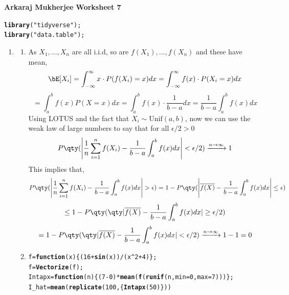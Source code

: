 \documentclass[12pt,english]{article}\usepackage[]{graphicx}\usepackage[]{xcolor}
\makeatletter
\newcommand{\hlnum}[1]{\textcolor[rgb]{0.686,0.059,0.569}{#1}}%
\newcommand{\hlsng}[1]{\textcolor[rgb]{0.192,0.494,0.8}{#1}}%
\newcommand{\hlopt}[1]{\textcolor[rgb]{0,0,0}{#1}}%
\newcommand{\hldef}[1]{\textcolor[rgb]{0.345,0.345,0.345}{#1}}%
\newcommand{\hlkwa}[1]{\textcolor[rgb]{0.161,0.373,0.58}{\textbf{#1}}}%
\newcommand{\hlkwb}[1]{\textcolor[rgb]{0.69,0.353,0.396}{#1}}%
\newcommand{\hlkwc}[1]{\textcolor[rgb]{0.333,0.667,0.333}{#1}}%
\newcommand{\hlkwd}[1]{\textcolor[rgb]{0.737,0.353,0.396}{\textbf{#1}}}%
\newenvironment{kframe}{%
 \def\at@end@of@kframe{}%
 \ifinner\ifhmode%
  \def\at@end@of@kframe{\end{minipage}}%
  \begin{minipage}{\columnwidth}%
 \fi\fi%
 \def\FrameCommand##1{\hskip\@totalleftmargin \hskip-\fboxsep
 \colorbox{shadecolor}{##1}\hskip-\fboxsep
     \hskip-\linewidth \hskip-\@totalleftmargin \hskip\columnwidth}%
 \MakeFramed {\advance\hsize-\width
   \@totalleftmargin\z@ \linewidth\hsize
   \@setminipage}}%
 {\par\unskip\endMakeFramed%
 \at@end@of@kframe}
\newenvironment{knitrout}{}{} %
\makeatother
\begin{document}
{\bf Arkaraj Mukherjee}
{\bf Worksheet 7}
\\
\begin{knitrout}
\color{fgcolor}\begin{kframe}
\begin{alltt}
\hlkwd{library}\hldef{(}\hlsng{"tidyverse"}\hldef{);}
\hlkwd{library}\hldef{(}\hlsng{"data.table"}\hldef{);}
\end{alltt}
\end{kframe}
\end{knitrout}
\begin{enumerate}[label=\arabic*.]
\item
\begin{enumerate}[label=(\alph*)]
\item As $X_1,\ldots,X_n$ are all i.i.d, so are $f(X_1),\ldots,f(X_n)$ and these have mean,
$$\bE[X_i]=\int_{-\infty}^{\infty}x\cdot
P(f(X_i)=x)dx=\int_{-\infty}^{\infty}f(x)\cdot
P(X_i=x)dx$$
$$=\int_a^bf(x)P(X=x)dx=\int_a^bf(x)\cdot\frac{1}{b-a}dx=\frac{1}{b-a}\int_a^bf(x)dx$$
Using LOTUS and the fact that $X_i\sim\text{Unif}(a,b)$, now we can use the weak law of large numbers to say that for all $\epsilon/2>0$
$$P\qty(\left|\frac{1}{n}\sum_{i=1}^nf(X_i)-\frac{1}{b-a}\int_a^bf(x)dx\right|<\epsilon/2)\xrightarrow{n\to\infty}1$$
This implies that,
$$P\qty(\left|\frac{1}{n}\sum_{i=1}^nf(X_i)-\frac{1}{b-a}\int_a^bf(x)dx\right|
>\epsilon)=1-P\qty(\left|\overline{f(X)}-\frac{1}{b-a}\int_a^bf(x)dx\right|\leq\epsilon)$$
$$\leq
1-P\qty(\qty|\overline{f(X)}-\frac{1}{b-a}\int_a^bf(x)dx|\geq\epsilon/2)$$
$$=1-P\qty(\qty|\overline{f(X)}-\frac{1}{b-a}\int_a^bf(x)dx|<\epsilon/2)\xrightarrow{n\to\infty}1-1=0$$
\item
\begin{knitrout}
\color{fgcolor}\begin{kframe}
\begin{alltt}
\hldef{f} \hlkwb{=} \hlkwa{function}\hldef{(}\hlkwc{x}\hldef{) \{(}\hlnum{16}\hlopt{+}\hlkwd{sin}\hldef{(x))}\hlopt{/}\hldef{(x}\hlopt{^}\hlnum{2}\hlopt{+}\hlnum{4}\hldef{)\};}
\hldef{f} \hlkwb{=} \hlkwd{Vectorize}\hldef{(f);}
\hldef{Intapx} \hlkwb{=} \hlkwa{function}\hldef{(}\hlkwc{n}\hldef{) \{(}\hlnum{7}\hlopt{-}\hlnum{0}\hldef{)}\hlopt{*}\hlkwd{mean}\hldef{(}\hlkwd{f}\hldef{(}\hlkwd{runif}\hldef{(n,}\hlkwc{min}\hldef{=}\hlnum{0}\hldef{,}\hlkwc{max}\hldef{=}\hlnum{7}\hldef{)))\};}
\hldef{I_hat} \hlkwb{=} \hlkwd{mean}\hldef{(}\hlkwd{replicate}\hldef{(}\hlnum{100}\hldef{,\{}\hlkwd{Intapx}\hldef{(}\hlnum{50}\hldef{)\}))}

\end{alltt}
\end{kframe}
\end{knitrout}
\end{enumerate}
\end{enumerate}
\end{document}
